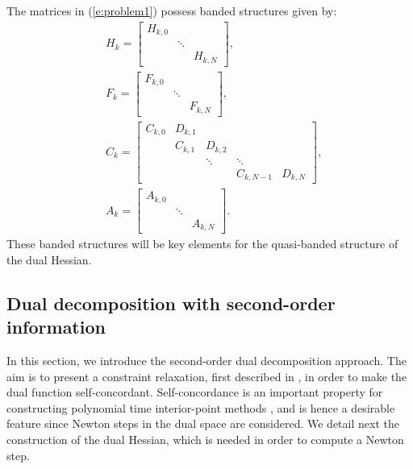 The matrices in (\ref{e:problem1}) possess banded structures given by:
\begin{subequations}
\begin{align}
& H_k = \left[ \begin{array}{ccc}
H_{k,0} & & \\
 & \ddots & \\
 & & H_{k,N}
\end{array} \right], \\
& F_k = \left[ \begin{array}{ccc}
F_{k,0} & & \\
 & \ddots & \\
 & & F_{k,N}
\end{array} \right], \\
& C_k = \left[ \begin{array}{ccccc} 
C_{k,0} & D_{k,1} &  &   &  \\
 & C_{k,1} & D_{k,2} &  &  \\
 &  & \ddots & \ddots &  \\
 &  &  & C_{k,N-1} & D_{k,N}
\end{array} \right], \label{e:C} \\
& A_k = \left[ \begin{array}{ccc}
A_{k,0} & & \\
 & \ddots & \\
 & & A_{k,N}
\end{array} \right].
\end{align}
\end{subequations}
These banded structures will be key elements for the quasi-banded structure of the dual Hessian.

\subsection{Dual decomposition with second-order information} \label{s:DualDecomposition}
In this section, we introduce the second-order dual decomposition approach. The aim is to present a constraint relaxation, first described in \cite{Necoara2009a}, in order to make the dual function self-concordant. Self-concordance is an important property for constructing polynomial time interior-point methods \cite{Nesterov1994}, and is hence a desirable feature since Newton steps in the dual space are considered. We detail next the construction of the dual Hessian, which is needed in order to compute a Newton step.

